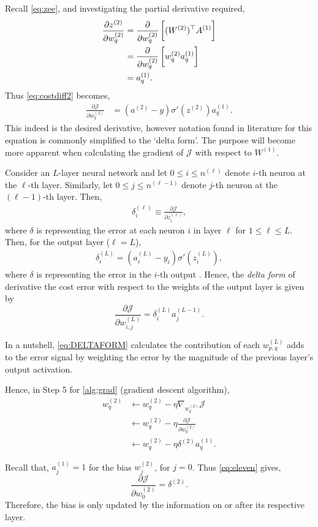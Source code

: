 Recall \autoref{eq:zee}, and investigating the partial derivative required,
\begin{align*}
\frac{\partial z^{(2)}}{\partial w^{(2)}_q} &= \frac{\partial}{\partial w^{(2)}_q} \sbr[3]{(W^{(2)})^\top A^{(1)}} \\
&=\frac{\partial}{\partial w^{(2)}_q} \sbr[3]{w^{(2)}_q a^{(1)}_q}\\
&= a^{(1)}_q.
\end{align*}
Thus \autoref{eq:costdiff2} becomes,
\begin{align}
    \frac{\partial \mathcal{J}}{\partial w^{(2)}_q} 
    &= (a^{(2)}-y) \sigma'(z^{(2)}) a^{(1)}_q. \label{eq:eleven}
\end{align}
This indeed is the desired derivative, however notation found in literature for this equation is commonly simplified to the `delta form'. The purpose will become more apparent when calculating the gradient of $\mathcal{J}$ with respect to $W^{(1)}$.
\begin{defn}
Consider an $L$-layer neural network and let $0\leq i \leq n^{(\ell)}$ denote $i$-th neuron at the $\ell$-th layer. Similarly, let $0\leq j \leq n^{(\ell-1)}$ denote $j$-th neuron at the $(\ell-1)$-th layer. Then,
\begin{align*}
   \delta^{(\ell)}_i \equiv \frac{\partial \mathcal{J}}{\partial z^{(\ell)}_i},
\end{align*}
where $\delta$ is representing the error at each neuron $i$ in layer $\ell$ for $1\leq \ell \leq L$.
Then, for the output layer ($\ell=L$),
\begin{align*}
    \delta^{(L)}_i = (a^{(L)}_i-y_i)\sigma'(z^{(L)}_i),
\end{align*}
where $\delta$ is representing the error in the $i$-th output \parencite{PIETILA2012987}.
\label{defn:deltaform}
Hence, the \textit{delta form} of derivative the cost error with respect to the weights of the output layer is given by
\begin{equation}
    \frac{\partial \mathcal{J}}{\partial w^{(L)}_{i,j}} = \delta^{(L)}_i a^{(L-1)}_{j}. \label{eq:DELTAFORM}
\end{equation}
\end{defn}
In a nutshell, \autoref{eq:DELTAFORM} calculates the contribution of each $w^{(L)}_{p,q}$ adds to the error signal by weighting the error by the magnitude of the previous layer's output activation. 

Hence, in Step 5 for \cref{alg:grad} (gradient descent algorithm),
\begin{align*}
    w^{(2)}_{q} & \leftarrow  w^{(2)}_q - \eta \nabla_{w^{(2)}_q} \mathcal{J} \\
    &\leftarrow  w^{(2)}_q - \eta \frac{\partial \mathcal{J}}{\partial w^{(2)}_q} \\
    &\leftarrow  w^{(2)}_{q} - \eta \delta^{(2)} a^{(1)}_q.
\end{align*}
\begin{rem}
Recall that, $a^{(1)}_j=1$ for the bias $w^{(2)}_j$, for $j=0$. Thus \autoref{eq:eleven} gives, 
$$ \frac{\partial \mathcal{J}}{\partial w^{(2)}_0} = \delta^{(2)}. $$
Therefore, the bias is only updated by the information on or after its respective layer. 
\end{rem}

